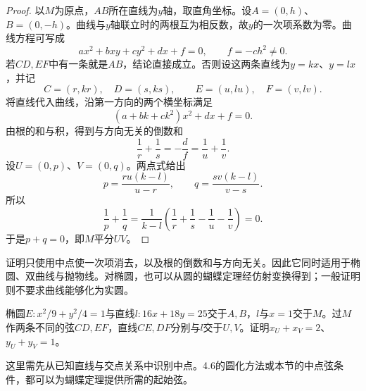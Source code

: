 \begin{proof}
以\(M\)为原点，\(AB\)所在直线为\(y\)轴，取直角坐标。设\(A=(0,h)\)、\(B=(0,-h)\)。曲线与\(y\)轴联立时的两根互为相反数，故\(y\)的一次项系数为零。曲线方程可写成
\begin{equation*}
    ax^2+bxy+cy^2+dx+f=0,
    \qquad f=-ch^2\ne0 .
\end{equation*}
若\(CD,EF\)中有一条就是\(AB\)，结论直接成立。否则设这两条直线为\(y=kx\)、\(y=lx\)，并记
\begin{equation*}
    C=(r,kr),\quad D=(s,ks),\qquad
    E=(u,lu),\quad F=(v,lv) .
\end{equation*}
将直线代入曲线，沿第一方向的两个横坐标满足
\begin{equation*}
    (a+bk+ck^2)x^2+dx+f=0 .
\end{equation*}
由根的和与积，得到与方向无关的倒数和
\begin{equation}\label{eq:quadratic-butterfly-reciprocal-sums}
    \frac1r+\frac1s=-\frac df
       =\frac1u+\frac1v .
\end{equation}
设\(U=(0,p)\)、\(V=(0,q)\)。两点式给出
\begin{equation*}
    p=\frac{ru(k-l)}{u-r},\qquad
    q=\frac{sv(k-l)}{v-s} .
\end{equation*}
所以
\begin{equation*}
    \frac1p+\frac1q
    =\frac1{k-l}\left(\frac1r+\frac1s-\frac1u-\frac1v\right)=0 .
\end{equation*}
于是\(p+q=0\)，即\(M\)平分\(UV\)。
\end{proof}

证明只使用中点使一次项消去，以及根的倒数和与方向无关。因此它同时适用于椭圆、双曲线与抛物线。对椭圆，也可以从圆的蝴蝶定理经仿射变换得到；一般证明则不要求曲线能够化为实圆。

\par\noindent\begin{minipage}{\linewidth}
\begin{example}
椭圆\(E:x^2/9+y^2/4=1\)与直线\(l:16x+18y=25\)交于\(A,B\)，\(l\)与\(x=1\)交于\(M\)。过\(M\)作两条不同的弦\(CD,EF\)，直线\(CE,DF\)分别与\(l\)交于\(U,V\)。证明\(x_U+x_V=2\)、\(y_U+y_V=1\)。
\end{example}
\end{minipage}\par

这里需先从已知直线与交点关系中识别中点。4.6的圆化方法或本节的中点弦条件，都可以为蝴蝶定理提供所需的起始弦。


